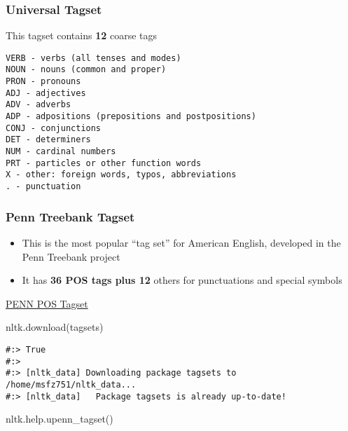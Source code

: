 \documentclass[
]{book}
\newenvironment{Shaded}{\begin{snugshade}}{\end{snugshade}}
\newcommand{\BuiltInTok}[1]{#1}
\newcommand{\NormalTok}[1]{#1}
\newcommand{\StringTok}[1]{\textcolor[rgb]{0.5,0.5,0.5}{#1}}
\providecommand{\tightlist}{%
  \setlength{\itemsep}{0pt}\setlength{\parskip}{0pt}}
\begin{document}
\hypertarget{universal-tagset}{%
\subsubsection{Universal Tagset}\label{universal-tagset}}

This tagset contains \textbf{12} coarse tags

\begin{verbatim}
VERB - verbs (all tenses and modes)
NOUN - nouns (common and proper)
PRON - pronouns
ADJ - adjectives
ADV - adverbs
ADP - adpositions (prepositions and postpositions)
CONJ - conjunctions
DET - determiners
NUM - cardinal numbers
PRT - particles or other function words
X - other: foreign words, typos, abbreviations
. - punctuation
\end{verbatim}

\hypertarget{penn-treebank-tagset}{%
\subsubsection{Penn Treebank Tagset}\label{penn-treebank-tagset}}

\begin{itemize}
\tightlist
\item
  This is the most popular ``tag set'' for American English, developed in the Penn Treebank project\\
\item
  It has \textbf{36 POS tags plus 12} others for punctuations and special symbols
\end{itemize}

\href{https://www.sketchengine.eu/penn-treebank-tagset/}{PENN POS Tagset}

\begin{Shaded}
\begin{Highlighting}[]
\NormalTok{nltk.download(}\StringTok{\textquotesingle{}tagsets\textquotesingle{}}\NormalTok{)}
\end{Highlighting}
\end{Shaded}

\begin{verbatim}
#:> True
#:> 
#:> [nltk_data] Downloading package tagsets to /home/msfz751/nltk_data...
#:> [nltk_data]   Package tagsets is already up-to-date!
\end{verbatim}

\begin{Shaded}
\begin{Highlighting}[]
\NormalTok{nltk.}\BuiltInTok{help}\NormalTok{.upenn\_tagset()}
\end{Highlighting}
\end{Shaded}
\end{document}
